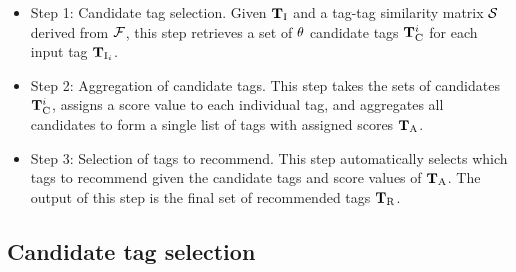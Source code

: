 \begin{itemize}
  \item Step 1: Candidate tag selection. Given $\mathbf{T}_{\text{I}}$ and a tag-tag similarity matrix $\mathcal{S}$ derived from $\mathcal{F}$, this step retrieves a set of $\theta$ candidate tags $\mathbf{T}_{\text{C}}^i$ for each input tag $\mathbf{T}_{\text{I}_i}$. %

  \item Step 2: Aggregation of candidate tags. This step takes the sets of candidates $\mathbf{T}_{\text{C}}^i$, assigns a score value to each individual tag, and aggregates all candidates to form a single list of tags with assigned scores $\mathbf{T}_{\text{A}}$.

  \item Step 3: Selection of tags to recommend. This step automatically selects which tags to recommend given the candidate tags and score values of $\mathbf{T}_{\text{A}}$. The output of this step is the final set of recommended tags $\mathbf{T}_{\text{R}}$.
\end{itemize}


\subsection{Candidate tag selection}
\label{sec:general:step1}



